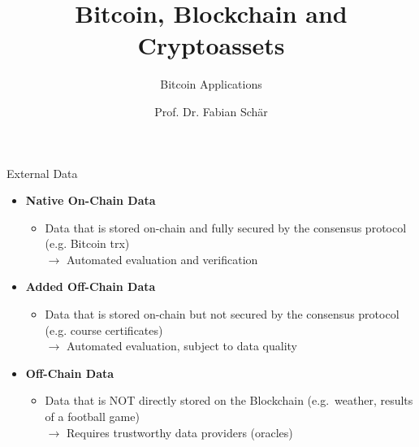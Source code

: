 \documentclass[]{beamer}
\title{Bitcoin, Blockchain and Cryptoassets}
\subtitle{Bitcoin Applications}
\author{Prof. Dr. Fabian Schär}
\institute{University of Basel}
\begin{document}
\thispagestyle{empty}
\begin{frame}[noframenumbering]
	\titlepage
\end{frame}


\begin{frame}{External Data}	
	\begin{itemize}
		\item<1 ->\textbf{Native On-Chain Data}
		\begin{itemize}
			\item<1 ->Data that is stored on-chain and fully secured by the consensus protocol (e.g. Bitcoin trx)\\
			\vspace{0.25em}$\rightarrow$ Automated evaluation and verification
		\end{itemize}
		\vspace{1em}
		\item<2 ->\textbf{Added Off-Chain Data}
		\begin{itemize}
			\item<2 -> Data that is stored on-chain but not secured by the consensus protocol (e.g. course certificates)\\
			\vspace{0.25em}$\rightarrow$ Automated evaluation, subject to data quality
		\end{itemize}
		\vspace{1em}
		\item<3 -> \textbf{Off-Chain Data}
		\begin{itemize}
			\item<3 -> Data that is NOT directly stored on the Blockchain (e.g.~weather, results of a football game)\\
			\vspace{0.25em}$\rightarrow$ Requires trustworthy data providers (oracles)
		\end{itemize}
	\end{itemize}
\end{frame}

\end{document}
